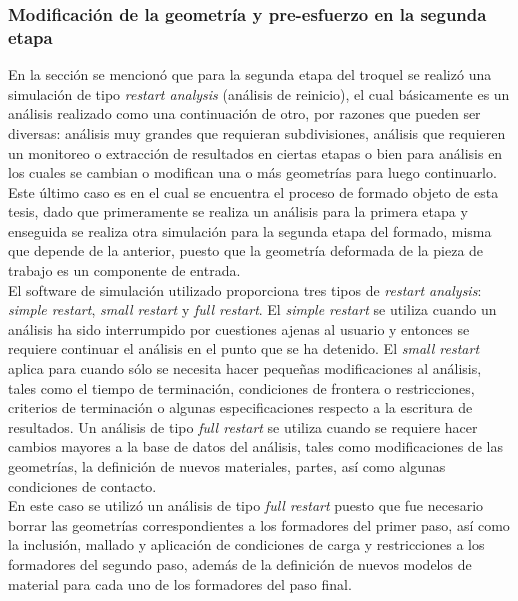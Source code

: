 \subsubsection{Modificación de la geometría y pre-esfuerzo en la segunda etapa}\label{sec:initial-stress}

En la sección \label{sec:consideraciones-generales} se mencionó que para la segunda etapa del troquel se realizó 
una simulación de tipo \textit{restart analysis} (análisis de reinicio), el cual 
básicamente es un análisis realizado como una continuación de otro, por razones que pueden ser diversas: 
análisis muy grandes que requieran subdivisiones, análisis que requieren un monitoreo o extracción de resultados 
en ciertas etapas o bien para análisis en los cuales se cambian o modifican una o más geometrías para luego 
continuarlo. Este último caso es en el cual se encuentra el proceso de formado objeto de esta tesis, dado 
que primeramente se realiza un análisis para la primera etapa y enseguida se realiza otra simulación para 
la segunda etapa del formado, misma que depende de la anterior, puesto que la geometría deformada de la pieza de trabajo es un componente de entrada.\\

El software de simulación utilizado proporciona tres tipos de \textit{restart analysis}: \textit{simple restart}, 
\textit{small restart} y \textit{full restart}. El \textit{simple restart} se utiliza cuando un análisis ha sido 
interrumpido por cuestiones ajenas al usuario y entonces se requiere continuar el análisis en el punto que 
se ha detenido. El \textit{small restart} aplica para cuando sólo se necesita hacer pequeñas modificaciones al 
análisis, tales como el tiempo de terminación, condiciones de frontera o restricciones, criterios de terminación o algunas 
especificaciones respecto a la escritura de resultados. Un análisis de tipo \textit{full restart} se utiliza 
cuando se requiere hacer cambios mayores a la base de datos del análisis, tales como modificaciones de las geometrías, 
la definición de nuevos materiales, partes, así como algunas condiciones de contacto.\\

En este caso se utilizó un análisis de tipo \textit{full restart} puesto que fue necesario borrar las geometrías 
correspondientes a los formadores del primer paso, así como la inclusión, mallado y aplicación de condiciones 
de carga y restricciones a los formadores del segundo paso, además de la definición de nuevos modelos de material 
para cada uno de los formadores del paso final.\\

